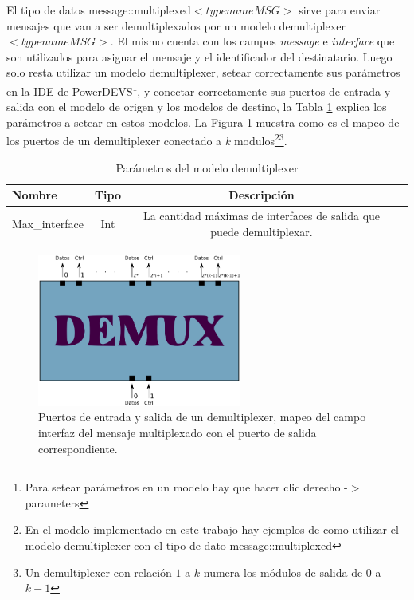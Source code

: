\documentclass[10pt,a4paper]{article}
\begin{document}
El tipo de datos message::multiplexed$<typename MSG>$ sirve para enviar mensajes que van a ser demultiplexados por un modelo demultiplexer$<typename MSG>$. El mismo cuenta con los campos \textit{message} e \textit{interface} que son utilizados para asignar el mensaje y el identificador del destinatario. Luego solo resta utilizar un modelo demultiplexer, setear correctamente sus parámetros en la IDE de PowerDEVS\footnote{Para setear parámetros en un modelo hay que hacer clic derecho -$>$ parameters}, y conectar correctamente sus puertos de entrada y salida con el modelo de origen y los modelos de destino, la Tabla \ref{table: parameter demultiplexer} explica los parámetros a setear en estos modelos. La Figura \ref{figure: demultiplexer} muestra como es el mapeo de los puertos de un demultiplexer conectado a \textit{k} modulos\footnote{En el modelo implementado en este trabajo hay ejemplos de como utilizar el modelo demultiplexer con el tipo de dato message::multiplexed}\footnote{Un demultiplexer con relación $1$ a $k$ numera los módulos de salida de $0$ a $k-1$}. \\

\begin{table}[h]
	\begin{tabular}{|l|c|c|c|}
  		\hline
  		\textbf{Nombre} & \textbf{Tipo} & \textbf{Descripción} \\
  		\hline
  		Max\_interface & Int & La cantidad máximas de interfaces de salida que puede demultiplexar. \\
  		\hline
	\end{tabular}
	\caption{Parámetros del modelo demultiplexer}
	\label{table: parameter demultiplexer}
\end{table}

\begin{figure}[htbp]
    \centering
    \includegraphics[width = 0.6\textwidth]{img/png/demultiplexer.png}
    \caption{Puertos de entrada y salida de un demultiplexer, mapeo del campo interfaz del mensaje multiplexado con el puerto de salida correspondiente.}
    \label{figure: demultiplexer}
\end{figure}
\end{document}
